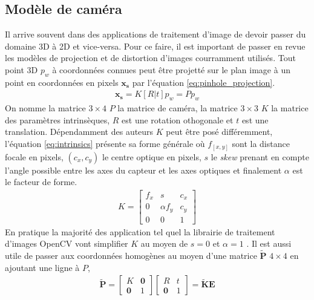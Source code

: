 \subsection{Modèle de caméra}
\label{subsec:modele_camera}

Il arrive souvent dans des applications de traitement d'image de devoir passer du domaine 3D à 2D et vice-versa. Pour ce faire, il est important de passer en revue les modèles de projection et de distortion d'images courramment utilisés. Tout point 3D $p_w$ à coordonnées connues peut être projetté sur le plan image à un point en coordonnées en pixels $\boldsymbol{x_s}$ par l'équation \ref{eq:pinhole_projection}.
\begin{align}
\boldsymbol{x_s} = K[R|t]p_w = P p_w
\label{eq:pinhole_projection}
\end{align}
On nomme la matrice $3\times4$ $P$ la matrice de caméra, la matrice $3\times3$ $K$ la matrice des paramètres intrinsèques, $R$ est une rotation othogonale et $t$ est une translation. Dépendamment des auteurs $K$ peut être posé différemment, l'équation \ref{eq:intrinsics} présente sa forme générale où $f_{[x,y]}$ sont la distance focale en pixels, $(c_x, c_y)$ le centre optique en pixels, $s$ le \textit{skew} prenant en compte l'angle possible entre les axes du capteur et les axes optiques et finalement $\alpha$ est le facteur de forme.
\begin{align}
  K = \begin{bmatrix}
  f_x & s & c_x \\
  0   & \alpha f_y & c_y \\
  0  &  0  & 1
\end{bmatrix}
\label{eq:intrinsics}
\end{align}
En pratique la majorité des application tel quel la librairie de traitement d'images OpenCV vont simplifier $K$ au moyen de $s = 0$ et $\alpha = 1$ \citep{itseez2015}. Il est aussi utile de passer aux coordonnées homogènes au moyen d'une matrice $\boldsymbol{\tilde{P}}$ $4\times4$ en ajoutant une ligne à $P$,
\begin{align}
  \boldsymbol{\tilde{P}} = \begin{bmatrix}K & \boldsymbol{0} \\ \boldsymbol{0} & 1\end{bmatrix}
  \begin{bmatrix}R & t \\ \boldsymbol{0} & 1\end{bmatrix} = \boldsymbol{\tilde{K}} \boldsymbol{E}
    \label{eq:homogeneous_projection}
\end{align}
